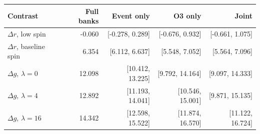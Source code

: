 \begin{tabular}{lrrrr}
\toprule
Contrast & Full banks & Event only & O3 only & Joint \\
\midrule
$\Delta r$, low spin & -0.060 & [-0.278, 0.289] & [-0.676, 0.932] & [-0.661, 1.075] \\
$\Delta r$, baseline spin & 6.354 & [6.112, 6.637] & [5.548, 7.052] & [5.564, 7.096] \\
$\Delta g$, $\lambda=0$ & 12.098 & [10.412, 13.225] & [9.792, 14.164] & [9.097, 14.333] \\
$\Delta g$, $\lambda=4$ & 12.892 & [11.193, 14.041] & [10.546, 15.001] & [9.871, 15.135] \\
$\Delta g$, $\lambda=16$ & 14.342 & [12.598, 15.522] & [11.874, 16.570] & [11.122, 16.724] \\
\bottomrule
\end{tabular}
